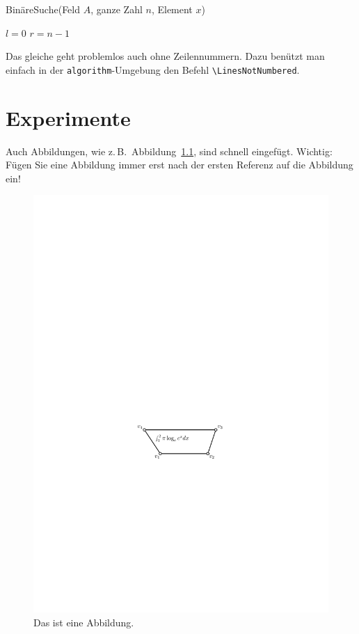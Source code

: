 \documentclass[bachelor,german]{info1thesis}
\begin{document}
\begin{algorithm}
  \caption{BinäreSuche(Feld $A$, ganze Zahl $n$, Element $x$)}
  \label{alg:binsearch}

  $l = 0$ \;
  $r = n-1$ \;

  \Return \False
\end{algorithm}

Das gleiche geht problemlos auch ohne Zeilennummern.  Dazu benützt man
einfach in der \verb+algorithm+-Umgebung den Befehl
\verb+\LinesNotNumbered+.


\chapter{Experimente}
Auch Abbildungen, wie z.\,B.\ Abbildung~\ref{fig:trapez}, sind schnell
eingefügt.  Wichtig: Fügen Sie eine Abbildung immer erst nach der
ersten Referenz auf die Abbildung ein!

\begin{figure}
  \centering
  \includegraphics[page=3]{abbildungen/trapez}
  \caption{Das ist eine Abbildung.}
  \label{fig:trapez}
\end{figure}
\end{document}
